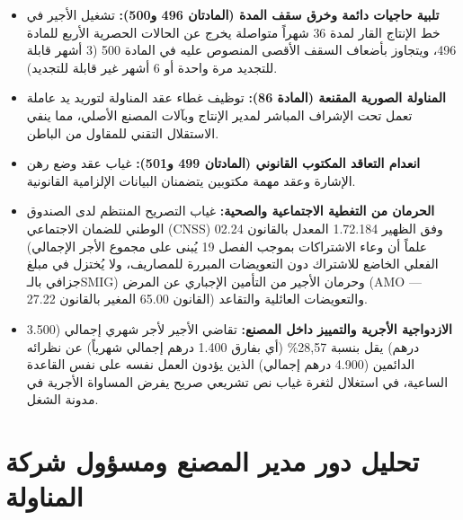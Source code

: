 \begin{tcolorbox}[colback=lightgray, colframe=accentcolor, arc=4pt,
    title={\textbf{المخالفات الجوهرية المرصودة في النازلة}}]
\begin{itemize}[leftmargin=*, itemsep=5pt]
    \item \textbf{تلبية حاجيات دائمة وخرق سقف المدة (المادتان \textenglish{496} و\textenglish{500}):} تشغيل الأجير في خط الإنتاج القار لمدة \textenglish{36} شهراً متواصلة يخرج عن الحالات الحصرية الأربع للمادة \textenglish{496}، ويتجاوز بأضعاف السقف الأقصى المنصوص عليه في المادة \textenglish{500} (\textenglish{3} أشهر قابلة للتجديد مرة واحدة أو \textenglish{6} أشهر غير قابلة للتجديد).
    \item \textbf{المناولة الصورية المقنعة (المادة \textenglish{86}):} توظيف غطاء عقد المناولة لتوريد يد عاملة تعمل تحت الإشراف المباشر لمدير الإنتاج وبآلات المصنع الأصلي، مما ينفي الاستقلال التقني للمقاول من الباطن.
    \item \textbf{انعدام التعاقد المكتوب القانوني (المادتان \textenglish{499} و\textenglish{501}):} غياب عقد وضع رهن الإشارة وعقد مهمة مكتوبين يتضمنان البيانات الإلزامية القانونية.
    \item \textbf{الحرمان من التغطية الاجتماعية والصحية:} غياب التصريح المنتظم لدى الصندوق الوطني للضمان الاجتماعي (\textenglish{CNSS}) وفق الظهير \textenglish{1.72.184} المعدل بالقانون \textenglish{02.24} (علماً أن وعاء الاشتراكات بموجب الفصل \textenglish{19} يُبنى على مجموع الأجر الإجمالي الفعلي الخاضع للاشتراك دون التعويضات المبررة للمصاريف، ولا يُختزل في مبلغ جزافي بالـ\textenglish{SMIG}) وحرمان الأجير من التأمين الإجباري عن المرض (\textenglish{AMO} --- القانون \textenglish{65.00} المغير بالقانون \textenglish{27.22}) والتعويضات العائلية والتقاعد.
    \item \textbf{الازدواجية الأجرية والتمييز داخل المصنع:} تقاضي الأجير لأجر شهري إجمالي (\textenglish{3.500} درهم) يقل بنسبة \textenglish{28,57\%} (أي بفارق \textenglish{1.400} درهم إجمالي شهرياً) عن نظرائه الدائمين (\textenglish{4.900} درهم إجمالي) الذين يؤدون العمل نفسه على نفس القاعدة الساعية، في استغلال لثغرة غياب نص تشريعي صريح يفرض المساواة الأجرية في مدونة الشغل.
\end{itemize}
\end{tcolorbox}

\section{تحليل دور مدير المصنع ومسؤول شركة المناولة}

